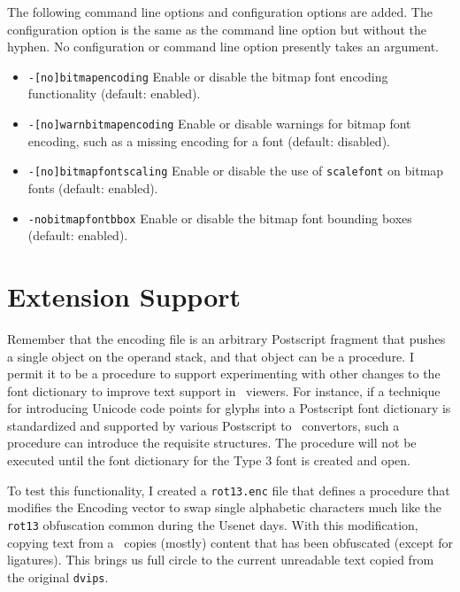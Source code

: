 \documentclass{ltugboat}
\def\PDF{\acro{PDF}}
\def\dvips{\texttt{dvips}}
\begin{document}
The following command line options and configuration options are
added.  The configuration option is the same as the command line
option but without the hyphen.  No configuration or command line
option presently takes an argument.

\begin{itemize}
\item \texttt{-[no]bitmapencoding} Enable or disable the bitmap font encoding
functionality (default: enabled).
\item \texttt{-[no]warnbitmapencoding} Enable or disable warnings for bitmap font
encoding, such as a missing encoding for a font (default: disabled).
\item \texttt{-[no]bitmapfontscaling} Enable or disable the use of
\texttt{scalefont} on bitmap fonts (default: enabled).
\item \texttt{-nobitmapfontbbox} Enable or disable the  bitmap font bounding
boxes (default: enabled).
\end{itemize}

\section{Extension Support}

Remember that the encoding file is an arbitrary Postscript fragment
that pushes a single object on the operand stack, and that object
can be a procedure.  I permit it to be a procedure to support
experimenting with other changes to the font dictionary to improve
text support in \PDF\ viewers.  For instance, if a technique for
introducing Unicode code points for glyphs into a Postscript font
dictionary is standardized and supported by various Postscript
to \PDF\ convertors, such a procedure can introduce the requisite
structures.  The procedure will not be executed until the
font dictionary for the Type 3 font is created and open.

To test this functionality, I created a \texttt{rot13.enc} file
that defines a procedure that modifies the Encoding vector to swap
single alphabetic characters much like the \texttt{rot13} obfuscation
common during the Usenet days.  With this modification, copying
text from a \PDF\ copies (mostly) content that has been obfuscated
(except for ligatures).  This brings us full circle to the
current unreadable text copied from the original \dvips.




\makesignature
\end{document}

